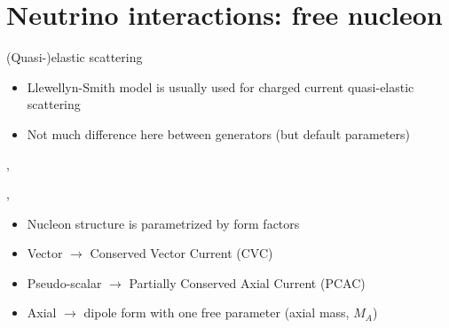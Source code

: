 \section[toc=$\nu N$ interactions]{Neutrino interactions: free nucleon}

\begin{slide}[toc=(Q)EL scattering]{(Quasi-)elastic scattering}
\null\vfill
  
  \twocolumn
  {
    \begin{itemize}
     \item Llewellyn-Smith model is usually used for charged current quasi-elastic scattering
     \item Not much difference here between generators (but default parameters)
    \end{itemize}
  }
  {
    \scalebox{0.75}{}
  }
  
  \sep
  
  \twocolumn
  {
    \centering\scalebox{0.5}{}
  }
  {
    \sep
    \begin{itemize}
     \item Nucleon structure is parametrized by form factors
    \end{itemize}
  }

  \begin{itemize}
    \item Vector $\rightarrow$ Conserved Vector Current (CVC)
    \item Pseudo-scalar $\rightarrow$ Partially Conserved Axial Current (PCAC)
    \item Axial $\rightarrow$ dipole form with one free parameter (axial mass, $M_A$)
  \end{itemize}

  
\vfill\null
\end{slide}

